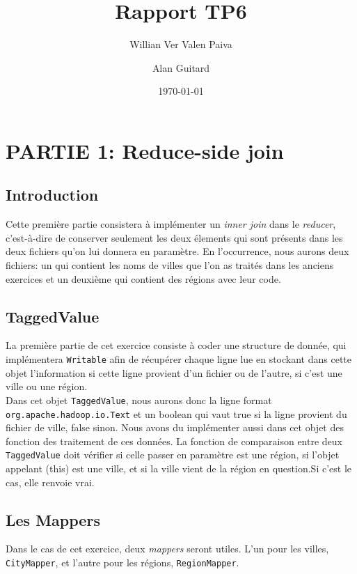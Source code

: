 \documentclass[a4paper]{article}
\author{Willian Ver Valen Paiva \and Alan Guitard}
\date{\today}
\title{Rapport TP6}
\begin{document}
\maketitle

\tableofcontents

\newpage

\section{PARTIE 1: Reduce-side join}

\subsection{Introduction}
Cette première partie consistera à implémenter un \textit{inner join} dans le \textit{reducer}, c'est-à-dire de conserver seulement les deux élements qui sont présents dans les deux fichiers qu'on lui donnera en paramètre. En l'occurrence, nous aurons deux fichiers: un qui contient les noms de villes que l'on as traités dans les anciens exercices et un deuxième qui contient des régions avec leur code.

\subsection{TaggedValue}

La première partie de cet exercice consiste à coder une structure de donnée, qui implémentera \verb?Writable? afin de récupérer chaque ligne lue en stockant dans cette objet l'information si cette ligne provient d'un fichier ou de l'autre, si c'est une ville ou une région.\\Dans cet objet \verb?TaggedValue?, nous aurons donc la ligne format \verb?org.apache.hadoop.io.Text? et un boolean qui vaut true si la ligne provient du fichier de ville, false sinon. 
Nous avons du implémenter aussi dans cet objet des fonction des traitement de ces données. La fonction de comparaison entre deux \verb?TaggedValue? doit vérifier si celle passer en paramètre est une région, si l'objet appelant (this) est une ville, et si la ville vient de la région en question.Si c'est le cas, elle renvoie vrai.

\subsection{Les Mappers}
Dans le cas de cet exercice, deux \textit{mappers} seront utiles. L'un pour les villes, \verb?CityMapper?, et l'autre pour les régions, \verb?RegionMapper?.
\end{document}
